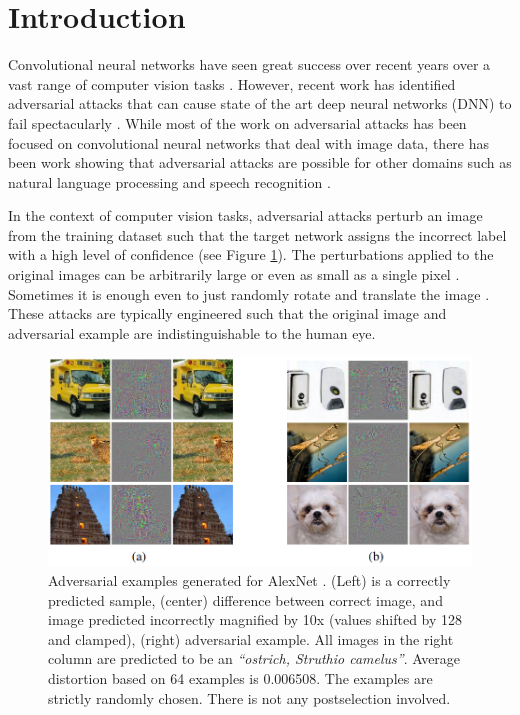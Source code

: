 \documentclass{article}
\begin{document}

\section{Introduction}
Convolutional neural networks have seen great success over recent years over a vast range of computer vision tasks \cite{lecun2010convolutional, krizhevsky2012imagenet, taigman2014deepface}. However, recent work has identified adversarial attacks that can cause state of the art deep neural networks (DNN) to fail spectacularly \cite{szegedy2013intriguing, goodfellow2014explaining, moosavi2016deepfool}. While most of the work on adversarial attacks has been focused on convolutional neural networks that deal with image data, there has been work showing that adversarial attacks are possible for other domains such as natural language processing and speech recognition \cite{papernot2016crafting, alzantot2018did}.

In the context of computer vision tasks, adversarial attacks perturb an image from the training dataset such that the target network assigns the incorrect label with a high level of confidence (see Figure \ref{fig:ostrich_examples}). The perturbations applied to the original images can be arbitrarily large or even as small as a single pixel \cite{su2019one}. Sometimes it is enough even to just randomly rotate and translate the image \cite{engstrom2017rotation}. These attacks are typically engineered such that the original image and adversarial example are indistinguishable to the human eye.

\begin{figure}
    \centering
    \includegraphics[width=\linewidth]{figures/adversarial-examples-ostrich.png}
    \caption{Adversarial examples generated for AlexNet \cite{krizhevsky2012imagenet}. (Left) is a correctly predicted sample, (center) difference between correct image, and image predicted incorrectly magnified by 10x (values shifted by 128 and clamped), (right) adversarial example. All images in the right column are predicted to be an \textit{``ostrich, Struthio camelus''}. Average distortion based on 64 examples is 0.006508. The examples are strictly randomly chosen. There is not any postselection involved.\protect\footnotemark}
    \label{fig:ostrich_examples}
\end{figure}
\end{document}
